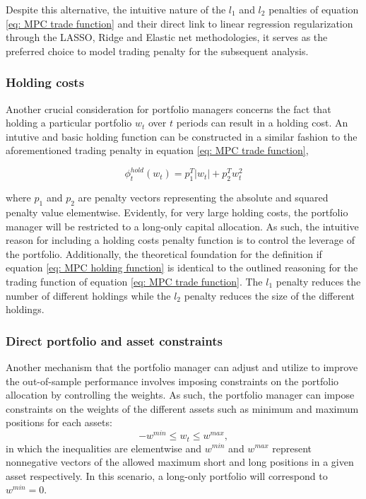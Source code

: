 Despite this alternative, the intuitive nature of the $l_1$ and $l_2$ penalties of equation \ref{eq: MPC trade function} and their direct link to linear regression regularization through the LASSO, Ridge and Elastic net methodologies, it serves as the preferred choice to model trading penalty for the subsequent analysis.

\subsubsection{Holding costs}
Another crucial consideration for portfolio managers concerns the fact that holding a particular portfolio $w_t$ over $t$ periods can result in a holding cost. An intutive and basic holding function can be constructed in a similar fashion to the aforementioned trading penalty in equation \ref{eq: MPC trade function},

\begin{equation}
    \phi_t^{hold}(w_t) = p_1^T|w_t| + p_2^Tw_t^2
    \label{eq: MPC holding function}
\end{equation}

where $p_1$ and $p_2$ are penalty vectors representing the absolute and squared penalty value elementwise. Evidently, for very large holding costs, the portfolio manager will be restricted to a long-only capital allocation. As such, the intuitive reason for including a holding costs penalty function is to control the leverage of the portfolio. Additionally, the theoretical foundation for the definition if equation \ref{eq: MPC holding function} is identical to the outlined reasoning for the trading function of equation \ref{eq: MPC trade function}. The $l_1$ penalty reduces the number of different holdings while the $l_2$ penalty reduces the size of the different holdings.

\subsubsection{ Direct portfolio and asset constraints}
Another mechanism that the portfolio manager can adjust and utilize to improve the out-of-sample performance involves imposing constraints on the portfolio allocation by controlling the weights. As such, the portfolio manager can impose constraints on the weights of the different assets such as minimum and maximum positions for each assets:
\begin{equation}
    -w^{min}\leq w_t\leq w^{max},
\end{equation}
in which the inequalities are elementwise and $w^{min}$ and $w^{max}$ represent nonnegative vectors of the allowed maximum short and long positions in a given asset respectively. In this scenario, a long-only portfolio will correspond to $w^{min}=0$.

